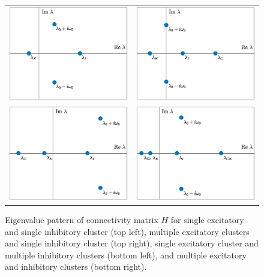 \documentclass[11pt,reqno]{amsart}
\begin{document}
\begin{figure}
    \centering
    \begin{tabular}{cc}
    \includegraphics[width=7cm]{images/eigpattern1.eps} &
    \includegraphics[width=7cm]{images/eigpattern2.eps} \\
    \includegraphics[width=7cm]{images/eigpattern3.eps} &
    \includegraphics[width=7cm]{images/eigpattern4.eps} 
    \end{tabular}
    \caption{Eigenvalue pattern of connectivity matrix $H$ for single excitatory and single inhibitory cluster (top left), multiple excitatory clusters and single inhibitory cluster (top right), single excitatory cluster and multiple inhibitory clusters (bottom left), and multiple excitatory and inhibitory clusters (bottom right). }
    \label{fig:Heigpattern}
\end{figure}
\end{document}
